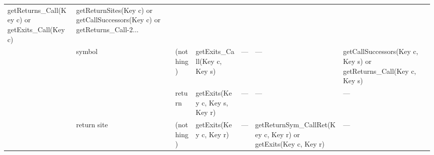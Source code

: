\begin{sidewaystable}
\begin{tabular}{x{0.6in}x{0.6in}x{0.6in}|x{1.9in}x{1.9in}x{1.9in}x{2in}}
                                                                                                                                    getReturns\_Call(Key c) or \newline
                                                                                                                                    getExits\_Call(Key c)                &  getReturnSites(Key c) or \newline
                                                                                                                                                                            getCallSuccessors(Key c) or \newline
                                                                                                                                                                            getReturns\_Call-2...                      \tabularnewline
                &  symbol           &  (nothing)    & getExits\_Call(Key c, Key s)  &   ---                                 &        ---                                 &  getCallSuccessors(Key c, Key s) \newline
                                                                                                                                                                                   or getReturns\_Call(Key c, Key s)   \tabularnewline
                &                   &  return       & getExits(Key c, Key s, Key r) &   ---                                 &        ---                                 &    ---                                      \tabularnewline
                &  return site      &  (nothing)    & getExits(Key c, Key r)        &   ---                                 &  getReturnSym\_CallRet(Key c, Key r) \newline
                                                                                                                               or getExits(Key c, Key r)                 &   ---                                       \tabularnewline
\midrule %

\end{tabular}
\end{sidewaystable}
